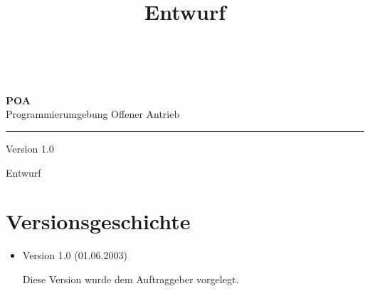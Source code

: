 \documentclass[a4paper,titlepage,12pt,ngerman]{scrbook}
\title {\huge \product\\[0.5cm]\large Entwurf\\[0.5cm] \version
  \\[1cm] \Large \company}
\newcommand\version{Version 1.0\xspace}
\begin{document}

\begin{titlepage}
\renewcommand{\thefootnote}{\fnsymbol{footnote}}
{\Huge
\raggedright
\textbf{POA} \\
\huge Programmierumgebung Offener Antrieb
\rule{\textwidth}{0.75pt}
\par
}
\begin{flushleft}
\normalsize
\version
\end{flushleft}
\vfill

{\parindent=0cm
\Huge Entwurf
}


\setcounter{footnote}{0}
\end{titlepage}


\section*{Versionsgeschichte}

\begin{itemize}

\item Version 1.0 (01.06.2003)

  Diese Version wurde dem Auftraggeber vorgelegt.

\end{itemize}


\tableofcontents








\appendix
\end{document}
